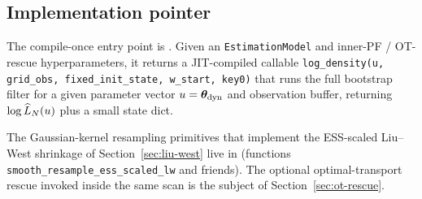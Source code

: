 \subsection{Implementation pointer}

The compile-once entry point is
.
Given an \texttt{EstimationModel} and inner-PF / OT-rescue
hyperparameters, it returns a JIT-compiled callable
\texttt{log\_density(u, grid\_obs, fixed\_init\_state, w\_start, key0)}
that runs the full bootstrap filter for a given parameter vector
$u = \bm{\theta}_{\rm dyn}$ and observation buffer, returning $\log \widehat{L}_N(u)$
plus a small state dict.

The Gaussian-kernel resampling primitives that implement the
ESS-scaled Liu--West shrinkage of Section~\ref{sec:liu-west} live in
 (functions
\texttt{smooth\_resample\_ess\_scaled\_lw} and friends). The optional
optimal-transport rescue invoked inside the same scan is the subject
of Section~\ref{sec:ot-rescue}.
